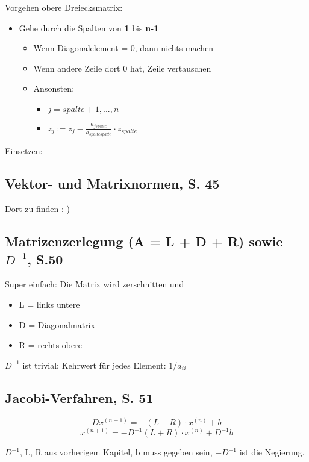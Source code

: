 Vorgehen obere Dreiecksmatrix:
\begin{itemize}
\item Gehe durch die Spalten von \textbf{1} bis \textbf{n-1}
\begin{itemize}
\item Wenn Diagonalelement = 0, dann nichts machen
\item Wenn andere Zeile dort 0 hat, Zeile vertauschen
\item Ansonsten:
\begin{itemize}
\item $j = spalte + 1, ..., n$
\item $z_j := z_j - \frac{a_{jspalte}}{a_{spaltespalte}} \cdot z_{spalte}$
\end{itemize}
\end{itemize}
\end{itemize}
Einsetzen:

\subsection{Vektor- und Matrixnormen, S. 45}
Dort zu finden :-)

\subsection{Matrizenzerlegung (A = L + D + R) sowie $D^{-1}$, S.50}
Super einfach: Die Matrix wird zerschnitten und
\begin{itemize}
\item L = links untere
\item D = Diagonalmatrix
\item R = rechts obere
\end{itemize}

$D^{-1}$ ist trivial: Kehrwert für jedes Element: $1/a_{ii}$

\subsection{Jacobi-Verfahren, S. 51}

\[D{x^{(n+1)}} = - (L+R) \cdot x^{(n)} + b\]
\[{x^{(n+1)}} = -D^{-1} (L+R) \cdot x^{(n)} + D^{-1} b\]

$D^{-1}$, L, R aus vorherigem Kapitel, b muss gegeben sein,
$-D^{-1}$ ist die Negierung.
